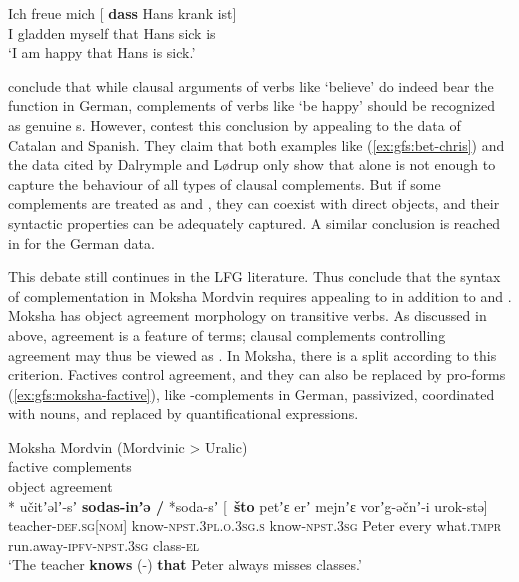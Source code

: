 \documentclass[output=paper]{../langscibook}
\begin{document}
    \ea\label{ex:gfs:nor-insist}
    \ea
        \gll Ich freue mich [ \textbf{dass} Hans krank ist]\\
        I gladden myself {} that Hans sick is\\
        \glt `I am happy that Hans is sick.'
        
        
    \z
    \z
\citet{DL00} conclude that while clausal arguments of verbs like `believe' do indeed bear the function \OBJ in German, complements of verbs like `be happy' should be recognized as genuine {\COMP}s. However, \citet{AMM05} contest this conclusion by appealing to the data of Catalan and Spanish. They claim that both examples like (\ref{ex:gfs:bet-chris}) and the data cited by Dalrymple and Lødrup only show that \OBJ alone is not enough to capture the behaviour of all types of clausal complements. But if some complements are treated as {\OBJTHETA} and {\OBLTHETA}, they can coexist with direct objects, and their syntactic properties can be adequately captured. A similar conclusion is reached in \citet{forst06} for the German data.
 
 This debate still continues in the LFG literature. Thus \citet{BelyaevKozhemyakinaSerdobolskaya2017} conclude that the syntax of complementation in Moksha Mordvin requires appealing to \COMP in addition to \OBJ and {\OBLTHETA}. Moksha has object agreement morphology on transitive verbs. As discussed in  above, agreement is a feature of terms; clausal complements controlling agreement may thus be viewed as \OBJ. In Moksha, there is a split according to this criterion. Factives control agreement, and they can also be replaced by pro-forms (\ref{ex:gfs:moksha-factive}), like \OBJ-complements in German, passivized, coordinated with nouns, and replaced by quantificational expressions.
 
 \ea\label{ex:gfs:moksha-factive} Moksha Mordvin (Mordvinic > Uralic)\\
 factive complements\\
    \ea object agreement\\*
    \gll učitʼəlʼ-sʼ \textbf{sodas-inʼə /} *soda-sʼ [~\textbf{što} petʼɛ erʼ mejnʼɛ vorʼg-əčnʼ-i urok-stə]\\
    teacher-\textsc{def.sg}[\textsc{nom}] know-\textsc{npst.3pl.o.3sg.s} \phantom{*}know-\textsc{npst.3sg} \phantom{[~}{\COMP} Peter every what.\textsc{tmpr} run.away-\textsc{ipfv-npst.3sg} class-\textsc{el}\\
    \glt `The teacher \textbf{knows} (\SUBJ-\OBJ) \textbf{that} Peter always misses classes.'
    
\end{document}

